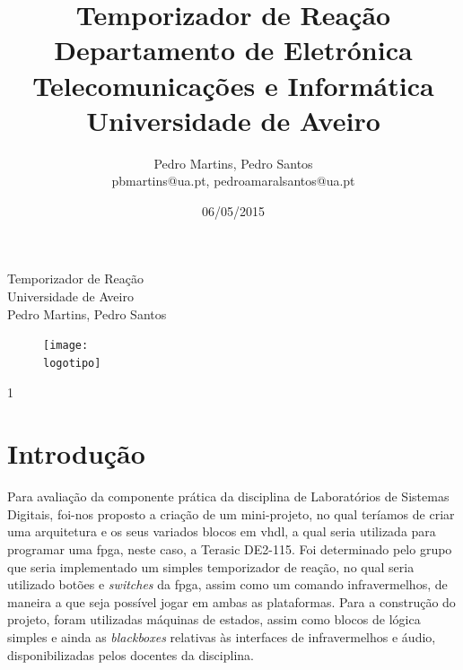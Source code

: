 \documentclass[a4paper,11pt,onecolumn]{report}
\begin{document}
%
\def\titulo{Temporizador de Reação}
\def\data{06/05/2015}
\def\autores{Pedro Martins, Pedro Santos}
\def\autorescontactos{pbmartins@ua.pt, pedroamaralsantos@ua.pt}
\def\versao{1}
\def\departamento{Departamento de Eletrónica Telecomunicações e Informática}
\def\empresa{Universidade de Aveiro}
\def\logotipo{ua.pdf}
%
%
\begin{titlepage}

\begin{center}
%
\vspace*{50mm}
%
{\Huge \titulo}\\ 
%
\vspace{10mm}
%
{\Large \empresa}\\
%
\vspace{10mm}
%
{\LARGE \autores}\\ 
%
%
\vspace{30mm}
%
\begin{figure}[h]
\center
\texttt{[image: \\logotipo]}
\end{figure}
%
\vspace{30mm}
\end{center}
%
\begin{flushright}
\versao
\end{flushright}
\end{titlepage}

%
%
%
%
\title{%
{\Huge\textbf{\titulo}}\\
{\Large \departamento\\ \empresa}
}
%
\author{%
    \autores \\
    \autorescontactos
}
%
\date{\data}
%
\maketitle

%
%

\tableofcontents


\clearpage
{}

\chapter{Introdução}
\label{chap.introducao}

Para avaliação da componente prática da disciplina de Laboratórios de Sistemas Digitais, foi-nos proposto a criação de um mini-projeto, no qual teríamos de criar uma arquitetura e os seus variados blocos em \ac{vhdl}, a qual seria utilizada para programar uma \ac{fpga}, neste caso, a Terasic DE2-115. Foi determinado pelo grupo que seria implementado um simples temporizador de reação, no qual seria utilizado botões e \textit{switches} da \ac{fpga}, assim como um comando infravermelhos, de maneira a que seja possível jogar em ambas as plataformas. Para a construção do projeto, foram utilizadas máquinas de estados, assim como blocos de lógica simples e ainda as \textit{blackboxes} relativas às interfaces de infravermelhos e áudio, disponibilizadas pelos docentes da disciplina.
\end{document}
